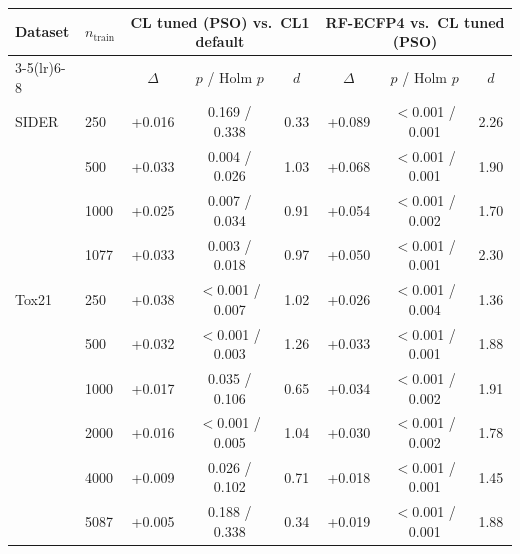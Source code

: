 \begin{tabular}{llcccccc}
\toprule
Dataset & $n_\mathrm{train}$ & \multicolumn{3}{c}{CL tuned (PSO) vs.\ CL1 default} & \multicolumn{3}{c}{RF-ECFP4 vs.\ CL tuned (PSO)} \\
\cmidrule(lr){3-5}\cmidrule(lr){6-8}
 & & $\Delta$ & $p$ / Holm $p$ & $d$ & $\Delta$ & $p$ / Holm $p$ & $d$ \\
\midrule
SIDER & 250 & +0.016 & 0.169 / 0.338 & 0.33 & +0.089 & $<$0.001 / 0.001 & 2.26 \\
 & 500 & +0.033 & 0.004 / 0.026 & 1.03 & +0.068 & $<$0.001 / 0.001 & 1.90 \\
 & 1000 & +0.025 & 0.007 / 0.034 & 0.91 & +0.054 & $<$0.001 / 0.002 & 1.70 \\
 & 1077 & +0.033 & 0.003 / 0.018 & 0.97 & +0.050 & $<$0.001 / 0.001 & 2.30 \\
\midrule
Tox21 & 250 & +0.038 & $<$0.001 / 0.007 & 1.02 & +0.026 & $<$0.001 / 0.004 & 1.36 \\
 & 500 & +0.032 & $<$0.001 / 0.003 & 1.26 & +0.033 & $<$0.001 / 0.001 & 1.88 \\
 & 1000 & +0.017 & 0.035 / 0.106 & 0.65 & +0.034 & $<$0.001 / 0.002 & 1.91 \\
 & 2000 & +0.016 & $<$0.001 / 0.005 & 1.04 & +0.030 & $<$0.001 / 0.002 & 1.78 \\
 & 4000 & +0.009 & 0.026 / 0.102 & 0.71 & +0.018 & $<$0.001 / 0.001 & 1.45 \\
 & 5087 & +0.005 & 0.188 / 0.338 & 0.34 & +0.019 & $<$0.001 / 0.001 & 1.88 \\
\bottomrule
\end{tabular}
